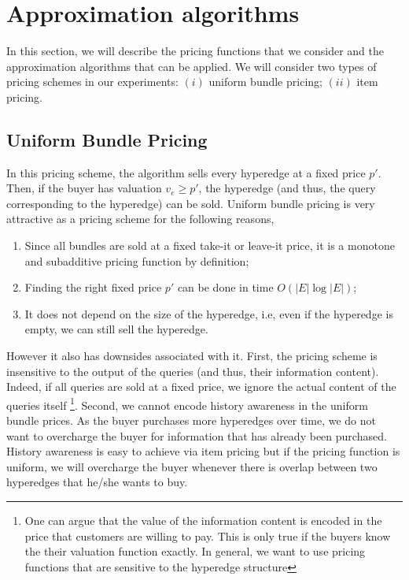 \section{Approximation algorithms}
\label{section-approxalgo}

In this section, we will describe the pricing functions that we consider and the approximation algorithms that can be applied. We will consider two types of pricing schemes in our experiments: $(i)$ uniform bundle pricing; $(ii)$ item pricing. 

\subsection{Uniform Bundle Pricing} 
\label{subsection-uniformbundle}

In this pricing scheme, the algorithm sells every hyperedge at a fixed price $p'$. Then, if the buyer has valuation $v_e \geq p'$, the hyperedge (and thus, the query corresponding to the hyperedge) can be sold. Uniform bundle pricing is very attractive as a pricing scheme for the following reasons, 

\begin{enumerate}
	\item Since all bundles are sold at a fixed take-it or leave-it price, it is a monotone and subadditive pricing function by definition;
	\item Finding the right fixed price $p'$ can be done in time  $O(|E|\log |E|)$;
	\item It does not depend on the size of the hyperedge, i.e, even if the hyperedge is empty, we can still sell the hyperedge.
\end{enumerate}

However it also has downsides associated with it. First, the pricing scheme is insensitive to the output of the queries (and thus, their information content). Indeed, if all queries are sold at a fixed price, we ignore the actual content of the queries itself \footnote{One can argue that the value of the information content is encoded in the price that customers are willing to pay. This is only true if the buyers know the their valuation function exactly. In general, we want to use pricing functions that are sensitive to the hyperedge structure}. Second, we cannot encode history awareness in the uniform bundle prices. As the buyer purchases more hyperedges over time, we do not want to overcharge the buyer for information that has already been purchased. 
History awareness is easy to achieve via item pricing but if the pricing function is uniform, we will overcharge the buyer whenever there is overlap between two hyperedges that he/she wants to buy.

